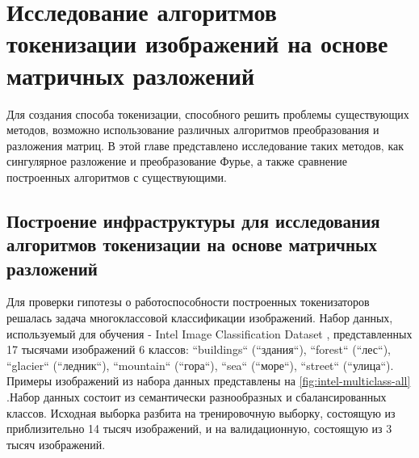 \section{Исследование алгоритмов токенизации изображений на основе матричных разложений}

Для создания способа токенизации, способного решить проблемы существующих методов, возможно использование различных алгоритмов преобразования и разложения матриц. В этой главе представлено исследование таких методов, как сингулярное разложение и преобразование Фурье, а также сравнение построенных алгоритмов с существующими.

\subsection{Построение инфраструктуры для исследования алгоритмов токенизации на основе матричных разложений}

Для проверки гипотезы о работоспособности построенных токенизаторов решалась задача многоклассовой классификации изображений. Набор данных, используемый для обучения - Intel Image Classification Dataset \cite{intel_image_dataset}, представленных 17 тысячами изображений 6 классов: ``buildings`` (``здания``), ``forest`` (``лес``), ``glacier`` (``ледник``), ``mountain`` (``гора``), ``sea`` (``море``), ``street`` (``улица``). Примеры изображений из набора данных представлены на  \autoref{fig:intel-multiclass-all} .Набор данных состоит из семантически разнообразных и сбалансированных классов. Исходная выборка разбита на тренировочную выборку, состоящую из приблизительно 14 тысяч изображений, и на валидационную, состоящую из 3 тысяч изображений.


